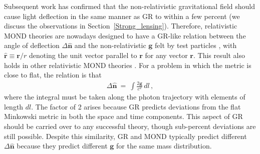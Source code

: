 \documentclass[fleqn,usenatbib,useAMS,onecolumn]{mnras} %
\begin{document}
Subsequent work has confirmed that the non-relativistic gravitational field should cause light deflection in the same manner as GR to within a few percent (we discuss the observations in Section~\ref{Strong_lensing}). Therefore, relativistic MOND theories are nowadays designed to have a GR-like relation between the angle of deflection $\Delta \widehat{\bm{n}}$ and the non-relativistic $\bm{g}$ felt by test particles \citep{Chiu_2006, Tian_2013}, with $\widehat{\bm{r}} \equiv \bm{r}/r$ denoting the unit vector parallel to $\bm{r}$ for any vector $\bm{r}$. This result also holds in other relativistic MOND theories \citep{Zlosnik_2007, Milgrom_2009_bimetric, Deffayet_2011, Milgrom_2019_nonlocal}. For a problem in which the metric is close to flat, the relation is that
\begin{eqnarray}
	\Delta \widehat{\bm{n}} ~=~ \int \frac{2 \bm{g}}{c^2} \, dl \, ,
	\label{Light_deflection_angle}
\end{eqnarray}
where the integral must be taken along the photon trajectory with elements of length $dl$. The factor of 2 arises because GR predicts deviations from the flat Minkowski metric in both the space and time components. This aspect of GR should be carried over to any successful theory, though sub-percent deviations are still possible. Despite this similarity, GR and MOND typically predict different $\Delta \widehat{\bm{n}}$ because they predict different $\bm{g}$ for the same mass distribution.

\end{document}
